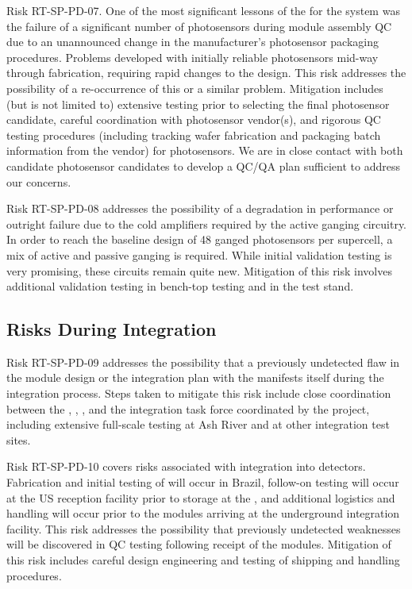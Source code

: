 Risk RT-SP-PD-07.  One of the most significant lessons of the  for the  system was the failure of a significant number of photosensors during module assembly QC due to an unannounced change in the manufacturer's photosensor packaging procedures.  Problems developed with initially reliable photosensors mid-way through fabrication, requiring rapid changes to the  design.  This risk addresses the possibility of a re-occurrence of this or a similar problem.  Mitigation includes (but is not limited to) extensive  testing prior to selecting the final photosensor candidate, careful coordination with photosensor vendor(s), and rigorous QC testing procedures (including tracking wafer fabrication and packaging batch information from the vendor) for photosensors.  We are in close contact with both candidate photosensor candidates to develop a QC/QA plan sufficient to address our concerns.


Risk RT-SP-PD-08 addresses the possibility of a degradation in  performance or outright failure due to the cold amplifiers required by the active ganging circuitry.  In order to reach the baseline design of 48 ganged photosensors per  supercell, a mix of active and passive ganging is required.  While initial validation testing is very promising, these circuits remain quite new.  Mitigation of this risk involves additional validation testing in bench-top testing and in the  test stand.

\subsection{Risks During Integration}

Risk RT-SP-PD-09 addresses the possibility that a previously undetected flaw in the  module design or the integration plan with the  manifests itself during the integration process.  Steps taken to mitigate this risk include close coordination between the , , , and the integration task force coordinated by the project, including extensive full-scale testing at Ash River and at other integration test sites.

Risk RT-SP-PD-10 covers risks associated with integration into  detectors.  Fabrication and initial testing of  will occur in Brazil, follow-on testing will occur at the US reception facility prior to storage at the , and additional logistics and handling will occur prior to the modules arriving at the underground integration facility. This risk addresses the possibility that previously undetected weaknesses will be discovered in QC testing following receipt of the modules.  Mitigation of this risk includes careful design engineering and testing of shipping and handling procedures.


